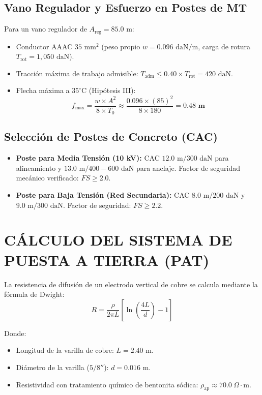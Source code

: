 \subsection{Vano Regulador y Esfuerzo en Postes de MT}
Para un vano regulador de $A_{\text{reg}} = 85.0\text{ m}$:
\begin{itemize}
  \item Conductor AAAC $35\text{ mm}^2$ (peso propio $w = 0.096\text{ daN/m}$, carga de rotura $T_{\text{rot}} = 1,050\text{ daN}$).
  \item Tracción máxima de trabajo admisible: $T_{\text{adm}} \le 0.40 \times T_{\text{rot}} = 420\text{ daN}$.
  \item Flecha máxima a $35^\circ\text{C}$ (Hipótesis III):
    $$f_{\text{max}} = \frac{w \times A^2}{8 \times T_0} \approx \frac{0.096 \times (85)^2}{8 \times 180} = \mathbf{0.48\text{ m}}$$
\end{itemize}

\subsection{Selección de Postes de Concreto (CAC)}
\begin{itemize}
  \item \textbf{Poste para Media Tensión (10 kV):} CAC $12.0\text{ m} / 300\text{ daN}$ para alineamiento y $13.0\text{ m} / 400-600\text{ daN}$ para anclaje. Factor de seguridad mecánico verificado: $FS \ge 2.0$.
  \item \textbf{Poste para Baja Tensión (Red Secundaria):} CAC $8.0\text{ m} / 200\text{ daN}$ y $9.0\text{ m} / 300\text{ daN}$. Factor de seguridad: $FS \ge 2.2$.
\end{itemize}

\section{CÁLCULO DEL SISTEMA DE PUESTA A TIERRA (PAT)}

La resistencia de difusión de un electrodo vertical de cobre se calcula mediante la fórmula de Dwight:
$$R = \frac{\rho}{2 \pi L} \left[ \ln\left( \frac{4L}{d} \right) - 1 \right]$$

Donde:
\begin{itemize}
  \item Longitud de la varilla de cobre: $L = 2.40\text{ m}$.
  \item Diámetro de la varilla ($5/8''$): $d = 0.016\text{ m}$.
  \item Resistividad con tratamiento químico de bentonita sódica: $\rho_{\text{ap}} \approx 70.0\ \Omega\cdot\text{m}$.
\end{itemize}

